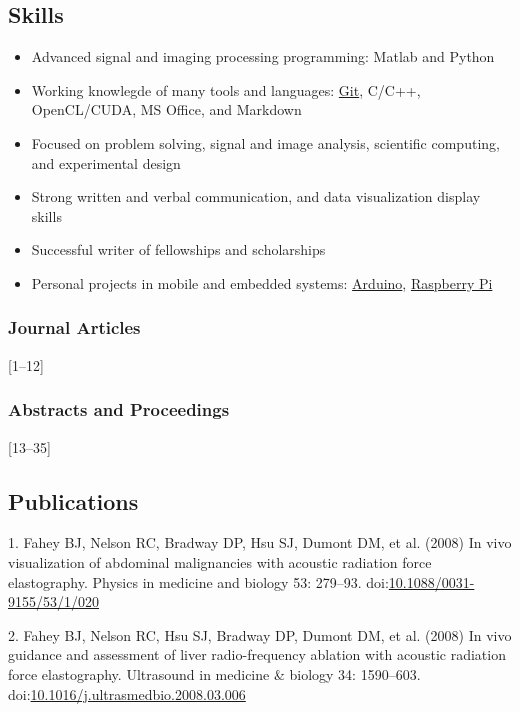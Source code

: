 \documentclass[]{article}
\begin{document}
\subsection{Skills}\label{skills}

\begin{itemize}
\itemsep1pt\parskip0pt
\item
  Advanced signal and imaging processing programming: Matlab and Python
\item
  Working knowlegde of many tools and languages:
  \href{http://git-scm.com/}{Git}, C/C++, OpenCL/CUDA, MS Office, and
  Markdown
\item
  Focused on problem solving, signal and image analysis, scientific
  computing, and experimental design
\item
  Strong written and verbal communication, and data visualization
  display skills
\item
  Successful writer of fellowships and scholarships
\item
  Personal projects in mobile and embedded systems:
  \href{http://www.arduino.cc/}{Arduino},
  \href{http://www.raspberrypi.org/}{Raspberry Pi}
\end{itemize}

\subsubsection{Journal Articles}\label{journal-articles}

{[}1--12{]}

\subsubsection{Abstracts and
Proceedings}\label{abstracts-and-proceedings}

{[}13--35{]}

\subsection{Publications}\label{publications}

1. Fahey BJ, Nelson RC, Bradway DP, Hsu SJ, Dumont DM, et al. (2008) In
vivo visualization of abdominal malignancies with acoustic radiation
force elastography. Physics in medicine and biology 53: 279--93.
doi:\href{http://dx.doi.org/10.1088/0031-9155/53/1/020}{10.1088/0031-9155/53/1/020}

2. Fahey BJ, Nelson RC, Hsu SJ, Bradway DP, Dumont DM, et al. (2008) In
vivo guidance and assessment of liver radio-frequency ablation with
acoustic radiation force elastography. Ultrasound in medicine \& biology
34: 1590--603.
doi:\href{http://dx.doi.org/10.1016/j.ultrasmedbio.2008.03.006}{10.1016/j.ultrasmedbio.2008.03.006}
\end{document}
